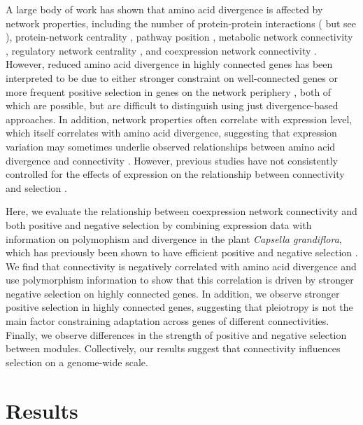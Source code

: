 A large body of work has shown that amino acid divergence is affected by network properties, including the number of protein-protein interactions (\citealt{Fraser2002-rg,lemos2005,Luisi2015-zz} but see \citealt{Hahn2004-ke,Jordan2003-ri}), protein-network centrality \citep{Hahn2005-au}, pathway position \citep{Rausher1999-nk,Ramsay2009-vf,Eanes2011-on}, metabolic network connectivity \citep{Vitkup2006-bo}, regulatory network centrality \citep{Jovelin2009-tu}, and coexpression network connectivity \citep{Jordan2004-vj,Carlson2006-ai}. However, reduced amino acid divergence in highly connected genes has been interpreted to be due to either stronger constraint on well-connected genes \citep{Hahn2005-au,Ramsay2009-vf} or more frequent positive selection in genes on the network periphery \citep{Kim2007-xn,Luisi2015-zz}, both of which are possible, but are difficult to distinguish using just divergence-based approaches. In addition, network properties often correlate with expression level, which itself correlates with amino acid divergence, suggesting that expression variation may sometimes underlie observed relationships between amino acid divergence and connectivity \citep{Drummond2006-pa}. However, previous studies have not consistently controlled for the effects of expression on the relationship between connectivity and selection \citep{Jordan2004-vj,Fraser2002-rg}.

Here, we evaluate the relationship between coexpression network connectivity and both positive and negative selection by combining  expression data with information on polymophism and divergence in the plant \textit{Capsella grandiflora}, which has previously been shown to have efficient positive and negative selection \citep{Williamson2014-tf}. We find that connectivity is negatively correlated with amino acid divergence and use polymorphism information to show that this correlation is driven by stronger negative selection on highly connected genes. In addition, we observe stronger positive selection in highly connected genes, suggesting that pleiotropy is not the main factor constraining adaptation across genes of different connectivities. Finally, we observe differences in the strength of positive and negative selection between modules. Collectively, our results suggest that connectivity influences selection on a genome-wide scale.

\section{Results}

